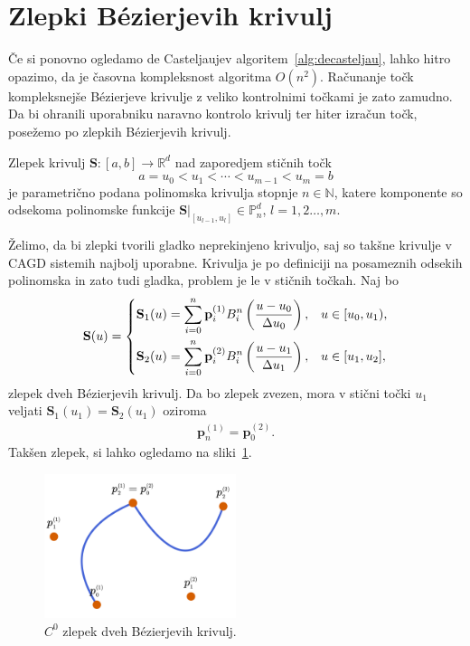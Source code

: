 \documentclass[isrm2, tisk]{fmfdelo}
\newcommand{\R}{\mathbb R}
\newcommand{\N}{\mathbb N}
\newcommand{\Pn}{\mathbb P_n}
\newcommand{\p}{\mathbf{p}}
\begin{document}
    \section{Zlepki Bézierjevih krivulj}
    Če si ponovno ogledamo de Casteljaujev algoritem~\ref{alg:decasteljau}, lahko hitro opazimo, da je časovna kompleksnost algoritma $O(n^2)$.
    Računanje točk kompleksnejše Bézierjeve krivulje z veliko kontrolnimi točkami je zato zamudno.
    Da bi ohranili uporabniku naravno kontrolo krivulj ter hiter izračun točk, posežemo po zlepkih Bézierjevih krivulj.
    \begin{definicija}
        Zlepek krivulj $\mathbf{S}:[a,b]\to \R^d$ nad zaporedjem stičnih točk \[a=u_0 < u_1 < \cdots < u_{m-1} < u_m = b\] je parametrično podana polinomska krivulja stopnje $n\in\N$, katere komponente so odsekoma polinomske funkcije $\mathbf{S}|_{[u_{l-1},u_l]} \in \Pn^d$, $l=1,2\ldots,m$.
    \end{definicija}
    \noindent Želimo, da bi zlepki tvorili gladko neprekinjeno krivuljo, saj so takšne krivulje v CAGD sistemih najbolj uporabne.
    Krivulja je po definiciji na posameznih odsekih polinomska in zato tudi gladka, problem je le v stičnih točkah.
    Naj bo
    \begin{align}
        \mathbf{S}(u) = \begin{dcases}
                            \mathbf{S}_1(u) = \sum_{i=0}^n \p_i^{(1)}B_i^n\left(\frac{u-u_0}{\Delta u_0}\right), & u \in [u_0,u_1),  \\
                            \mathbf{S}_2(u) = \sum_{i=0}^n \p_i^{(2)}B_i^n\left(\frac{u-u_1}{\Delta u_1}\right), & u \in [u_1,u_2],
        \end{dcases} \label{eq:zlepek-def}
    \end{align}
    zlepek dveh Bézierjevih krivulj.
    Da bo zlepek zvezen, mora v stični točki $u_1$ veljati $\mathbf{S}_1(u_1) = \mathbf{S}_2(u_1)$ oziroma
    \begin{align}
        \label{c0-zlepek-ref}
        \p_n^{(1)} = \p_0^{(2)}.
    \end{align}
    Takšen zlepek, si lahko ogledamo na sliki~\ref{fig:zlepek-c0}.
    \begin{figure}[h]
        \centering
        \includegraphics[width = 0.50\textwidth]{images/zlepek-c0}
        \caption{$C^0$ zlepek dveh Bézierjevih krivulj.}
        \label{fig:zlepek-c0}
    \end{figure}
\end{document}
